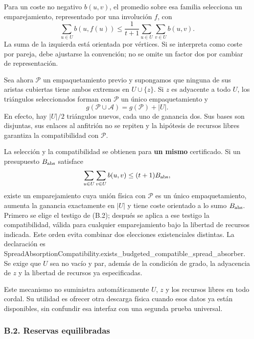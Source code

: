 \documentclass[spanish,11pt,a4paper]{article}
\begin{document}
Para un coste no negativo \(b(u,v)\), el promedio sobre esa familia selecciona un emparejamiento, representado por una involución \(f\), con \[
\sum_{u\in U}b(u,f(u))
\le\frac1{t+1}\sum_{u\in U}\sum_{v\in U}b(u,v).
\tag{B.2}
\] La suma de la izquierda está orientada por vértices. Si se interpreta como coste por pareja, debe ajustarse la convención; no se omite un factor dos por cambiar de representación.

Sea ahora \(\mathcal P\) un empaquetamiento previo y supongamos que ninguna de sus aristas cubiertas tiene ambos extremos en \(U\cup\{z\}\). Si \(z\) es adyacente a todo \(U\), los triángulos seleccionados forman con \(\mathcal P\) un único empaquetamiento y \[
g(\mathcal P\cup\mathcal A)=g(\mathcal P)+|U|.
\tag{B.3}
\] En efecto, hay \(|U|/2\) triángulos nuevos, cada uno de ganancia dos. Sus bases son disjuntas, sus enlaces al anfitrión no se repiten y la hipótesis de recursos libres garantiza la compatibilidad con \(\mathcal P\).

La selección y la compatibilidad se obtienen para \textbf{un mismo} certificado. Si un presupuesto \(B_{\rm abs}\) satisface \[
\sum_{u\in U}\sum_{v\in U}b(u,v)\le(t+1)B_{\rm abs},
\] existe un emparejamiento cuya unión física con \(\mathcal P\) es un único empaquetamiento, aumenta la ganancia exactamente en \(|U|\) y tiene coste orientado a lo sumo \(B_{\rm abs}\). Primero se elige el testigo de (B.2); después se aplica a ese testigo la compatibilidad, válida para cualquier emparejamiento bajo la libertad de recursos indicada. Este orden evita combinar dos elecciones existenciales distintas. La declaración es {\ttfamily\small SpreadAbsorp\discretionary{\hbox{\ensuremath{\hookrightarrow}}}{}{}tionCompatib\discretionary{\hbox{\ensuremath{\hookrightarrow}}}{}{}ility.\discretionary{\hbox{\ensuremath{\hookrightarrow}}}{}{}exists\_\discretionary{\hbox{\ensuremath{\hookrightarrow}}}{}{}budgeted\_\discretionary{\hbox{\ensuremath{\hookrightarrow}}}{}{}compatible\_\discretionary{\hbox{\ensuremath{\hookrightarrow}}}{}{}spread\_\discretionary{\hbox{\ensuremath{\hookrightarrow}}}{}{}absorber}. Se exige que \(U\) sea no vacío y par, además de la condición de grado, la adyacencia de \(z\) y la libertad de recursos ya especificadas.

Este mecanismo no suministra automáticamente \(U\), \(z\) y los recursos libres en todo cordal. Su utilidad es ofrecer otra descarga física cuando esos datos ya están disponibles, sin confundir esa interfaz con una segunda prueba universal.

\subsubsection{B.2. Reservas equilibradas}\label{b.2.-reservas-equilibradas}
\end{document}
